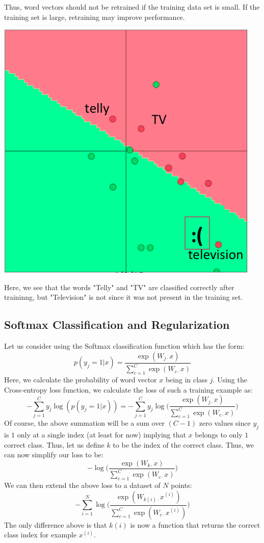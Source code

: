 \documentclass{tufte-handout}
\begin{document}
Thus, word vectors should not be retrained if the training data set is small. If the training set is large, retraining may improve performance.

\begin{marginfigure}%
  \includegraphics[width = \linewidth]{retraining}
  \caption{Here, we see that the words "Telly" and "TV" are classified correctly after traininng, but "Television" is not since it was not present in the training set.}
    \label{fig:retraining}
\end{marginfigure}

\subsection{Softmax Classification and Regularization}

Let us consider using the Softmax classification function which has the form:
$$p(y_j = 1|x) = \frac{\exp(W_{j\cdot}x)}{\sum_{c=1}^C\exp(W_{c\cdot}x)}$$
Here, we calculate the probability of word vector $x$ being in class $j$. Using the Cross-entropy loss function, we calculate the loss of such a training example as:
$$-\sum_{j=1}^{C}y_j\log(p(y_j = 1|x)) = -\sum_{j=1}^{C}y_j\log \bigg(\frac{\exp(W_{j\cdot}x)}{\sum_{c=1}^C\exp(W_{c\cdot}x)}\bigg)$$
Of course, the above summation will be a sum over $(C-1)$ zero values since $y_j$ is $1$ only at a single index (at least for now) implying that $x$ belongs to only $1$ correct class. Thus, let us define $k$ to be the index of the correct class. Thus, we can now simplify our loss to be:
$$-\log \bigg(\frac{\exp(W_{k\cdot}x)}{\sum_{c=1}^C\exp(W_{c\cdot}x)}\bigg)$$
We can then extend the above loss to a dataset of $N$ points:
$$-\sum_{i = 1}^N\log \bigg(\frac{\exp(W_{k{(i)}\cdot}x^{(i)})}{\sum_{c=1}^C\exp(W_{c\cdot}x^{(i)})}\bigg)$$
The only difference above is that $k(i)$ is now a function that returns the correct class index for example $x^{(i)}$.
\end{document}
